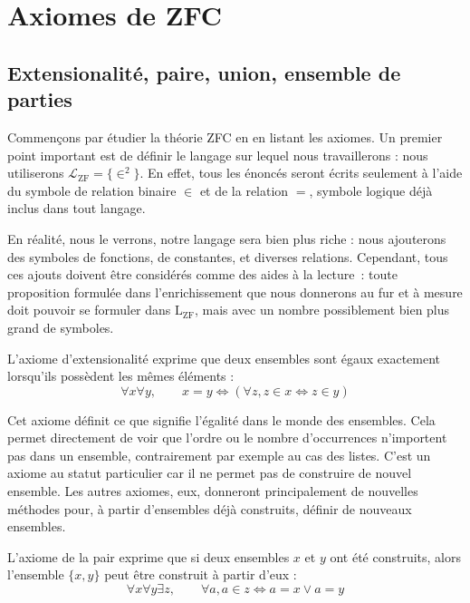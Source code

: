 \section{Axiomes de ZFC}

\subsection[Premiers axiomes]{Extensionalité, paire, union, ensemble de parties}

Commençons par étudier la théorie ZFC en en listant les axiomes. Un premier
point important est de définir le langage sur lequel nous travaillerons : nous
utiliserons $\mathcal L_{\mathrm{ZF}} = \{ \in^2\}$. En effet, tous les énoncés
seront écrits seulement à l'aide du symbole de relation binaire $\in$ et de la
relation $=$, symbole logique déjà inclus dans tout langage.

\begin{remark}
  En réalité, nous le verrons, notre langage sera bien plus riche : nous
  ajouterons des symboles de fonctions, de constantes, et diverses relations.
  Cependant, tous ces ajouts doivent être considérés comme des aides à la
  lecture~: toute proposition formulée dans l'enrichissement que nous donnerons
  au fur et à mesure doit pouvoir se formuler dans $\mathrm L_{\mathrm{ZF}}$, mais
  avec un nombre possiblement bien plus grand de symboles.
\end{remark}

\begin{axiom}[Extensionalité]
  L'axiome d'extensionalité exprime que deux ensembles sont égaux exactement
  lorsqu'ils possèdent les mêmes éléments :
  \[\forall x \forall y, \qquad x = y \iff (\forall z, z \in x\iff z \in y)\]
\end{axiom}

Cet axiome définit ce que signifie l'égalité dans le monde des ensembles. Cela
permet directement de voir que l'ordre ou le nombre d'occurrences n'importent
pas dans un ensemble, contrairement par exemple au cas des listes. C'est un
axiome au statut particulier car il ne permet pas de construire de nouvel
ensemble. Les autres axiomes, eux, donneront principalement de nouvelles
méthodes pour, à partir d'ensembles déjà construits, définir de nouveaux
ensembles.

\begin{axiom}[Paire]\label{ax.ZF.pair}
  L'axiome de la pair exprime que si deux ensembles $x$ et $y$ ont été
  construits, alors l'ensemble $\{x,y\}$ peut être construit à partir d'eux :
  \[\forall x \forall y \exists z, \qquad \forall a, a \in z \iff
  a = x \lor a = y\]
\end{axiom}

